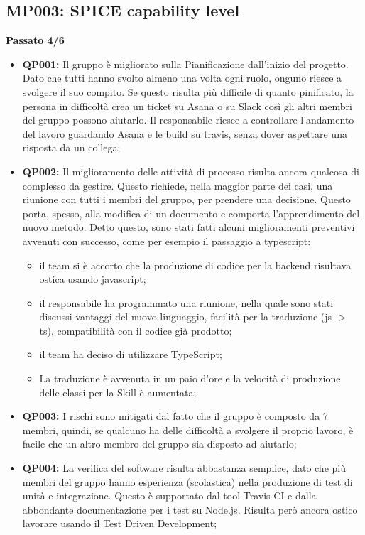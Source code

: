 \subsection{MP003: SPICE capability level}
\textbf{Passato 4/6}
\begin{itemize}
	\item \textbf{QP001:} Il gruppo è migliorato sulla Pianificazione dall'inizio del progetto. Dato che tutti hanno svolto almeno una volta ogni ruolo, onguno riesce a svolgere il suo compito. Se questo risulta più difficile di quanto pinificato, la persona in difficoltà crea un ticket su Asana o su Slack così gli altri membri del gruppo possono aiutarlo. Il responsabile riesce a controllare l'andamento del lavoro guardando Asana e le build su travis, senza dover aspettare una risposta da un collega;
	\item \textbf{QP002:} Il miglioramento delle attività di processo risulta ancora qualcosa di complesso da gestire. Questo richiede, nella maggior parte dei casi, una riunione con tutti i membri del gruppo, per prendere una decisione. Questo porta, spesso, alla modifica di un documento e comporta l'apprendimento del nuovo metodo. Detto questo, sono stati fatti alcuni miglioramenti preventivi avvenuti con successo, come per esempio il passaggio a typescript:
		\begin{itemize}
			\item il team si è accorto che la produzione di codice per la backend risultava ostica usando javascript;
			\item il responsabile ha programmato una riunione, nella quale sono stati discussi vantaggi del nuovo linguaggio, facilità per la traduzione (js -> ts), compatibilità con il codice già prodotto;
			\item il team ha deciso di utilizzare TypeScript; 
			\item La traduzione è avvenuta in un paio d'ore e la velocità di produzione delle classi per la Skill è aumentata;
		\end{itemize} 
	\item \textbf{QP003:} I rischi sono mitigati dal fatto che il gruppo è composto da 7 membri, quindi, se qualcuno ha delle difficoltà a svolgere il proprio lavoro, è facile che un altro membro del gruppo sia disposto ad aiutarlo;
	\item \textbf{QP004:} La verifica del software risulta abbastanza semplice, dato che più membri del gruppo hanno esperienza (scolastica) nella produzione di test di unità e integrazione. Questo è supportato dal tool Travis-CI e dalla abbondante documentazione per i test su Node.js. Risulta però ancora ostico lavorare usando il Test Driven Development;

\end{itemize}
